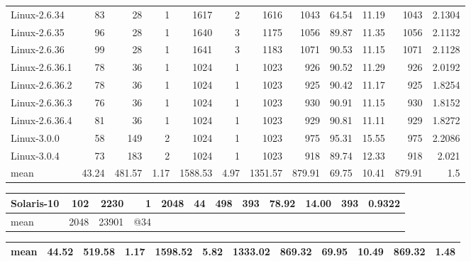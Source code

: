 \documentclass[11pt]{article}
\begin{document}
\begin{center}
\begin{tabular}{lrrrrrrrrrrr}
 Linux-2.6.34           &     83  &      28  &                  1  &     1617  &     2  &      1616  &       1043  &    64.54  &    11.19  &    1043  &   2.1304  \\
 Linux-2.6.35           &     96  &      28  &                  1  &     1640  &     3  &      1175  &       1056  &    89.87  &    11.35  &    1056  &   2.1132  \\
 Linux-2.6.36           &     99  &      28  &                  1  &     1641  &     3  &      1183  &       1071  &    90.53  &    11.15  &    1071  &   2.1128  \\
 Linux-2.6.36.1         &     78  &      36  &                  1  &     1024  &     1  &      1023  &        926  &    90.52  &    11.29  &     926  &   2.0192  \\
 Linux-2.6.36.2         &     78  &      36  &                  1  &     1024  &     1  &      1023  &        925  &    90.42  &    11.17  &     925  &   1.8254  \\
 Linux-2.6.36.3         &     76  &      36  &                  1  &     1024  &     1  &      1023  &        930  &    90.91  &    11.15  &     930  &   1.8152  \\
 Linux-2.6.36.4         &     81  &      36  &                  1  &     1024  &     1  &      1023  &        929  &    90.81  &    11.11  &     929  &   1.8272  \\
 Linux-3.0.0            &     58  &     149  &                  2  &     1024  &     1  &      1023  &        975  &    95.31  &    15.55  &     975  &   2.2086  \\
 Linux-3.0.4            &     73  &     183  &                  2  &     1024  &     1  &      1023  &        918  &    89.74  &    12.33  &     918  &    2.021  \\
\hline
\hline
 mean                   &  43.24  &  481.57  &               1.17  &  1588.53  &  4.97  &   1351.57  &     879.91  &    69.75  &    10.41  &  879.91  &      1.5  \\
\end{tabular}
\end{center}






\begin{center}
\begin{tabular}{lrrrrrrrrrrr}
 Solaris-10  &   102  &   2230  &    1  &  2048  &  44  &  498  &  393  &  78.92  &  14.00  &  393  &  0.9322  \\
\hline
\hline
 mean        &  2048  &  23901  &  @34  &        &      &       &       &         &         &       &          \\
\end{tabular}
\end{center}





\begin{center}
\begin{tabular}{lrrrrrrrrrrr}
 mean  &  44.52  &  519.58  &  1.17  &  1598.52  &  5.82  &  1333.02  &  869.32  &  69.95  &  10.49  &  869.32  &  1.48  \\
\hline
\end{tabular}
\end{center}
\end{document}
